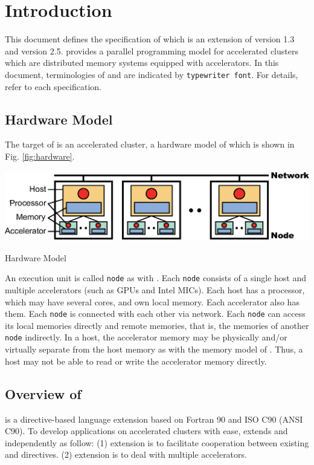 \chapter{Introduction}\label{chap:intro}
\setcounter{page}{1}
This document defines the specification of {\XACC} which is an extension of {\XMP} version 1.3\cite{xmp} and {\OACC} version 2.5\cite{openacc}.
{\XACC} provides a parallel programming model for accelerated clusters
which are distributed memory systems equipped with accelerators.
In this document,
terminologies of {\XMP} and {\OACC} are indicated by {\tt typewriter font}.
For details, refer to each specification\cite{xmp,openacc}.

\section{Hardware Model}
The target of {\XACC} is an accelerated cluster,
a hardware model of which is shown in Fig. \ref{fig:hardware}.

\begin{myfigure}
  \includegraphics[scale=0.9,clip]{figs/hardware.eps}
  \caption{Hardware Model}\label{fig:hardware}
\end{myfigure}

An execution unit is called {\tt node} as with {\XMP}.
Each {\tt node} consists of a single host and multiple accelerators (such as GPUs and Intel MICs).
Each host has a processor, which may have several cores, and own local memory.
Each accelerator also has them.
Each {\tt node} is connected with each other via network.
Each {\tt node} can access its local memories directly and remote memories,
that is, the memories of another {\tt node} indirectly.
In a host,
the accelerator memory may be physically and/or virtually separate from the host memory as with the memory model of {\OACC}.
Thus,
a host may not be able to read or write the accelerator memory directly.

\section{Overview of {\XACC}}
{\XACC} is a directive-based language extension based on Fortran 90 and ISO C90 (ANSI C90).
To develop applications on accelerated clusters with ease,
{\XACC} extends {\XMP} and {\OACC} independently as follow:
(1) {\XMP} extension is to facilitate cooperation between existing {\XMP} and {\OACC} directives.
(2) {\OACC} extension is to deal with multiple accelerators.

